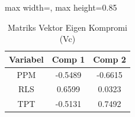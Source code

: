 \begin{table}[H]
\centering
\caption{Matriks Vektor Eigen Kompromi (Vc)} \label{tab:samplevc}
\begin{adjustbox}{max width=\textwidth, max height=0.85\textheight}
\begin{tabular}{|c|c|c|}
\hline
\textbf{Variabel} & \textbf{Comp 1} & \textbf{Comp 2} \\
\hline
PPM & -0.5489 & -0.6615 \\
RLS & 0.6599 & 0.0323 \\
TPT & -0.5131 & 0.7492 \\
\hline
\end{tabular}
\end{adjustbox}
\end{table}
